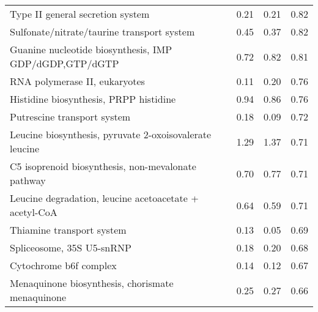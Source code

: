 \begin{sidewaystable}
\begin{center}
\begin{tabularx}{\textwidth}{Xlll}
Type II general secretion system & 0.21 & 0.21 & 0.82\\
Sulfonate/nitrate/taurine transport system & 0.45 & 0.37 & 0.82\\
Guanine nucleotide biosynthesis, IMP \textrightarrow{} GDP/dGDP,GTP/dGTP & 0.72 & 0.82 & 0.81\\
RNA polymerase II, eukaryotes & 0.11 & 0.20 & 0.76\\
Histidine biosynthesis, PRPP \textrightarrow{} histidine & 0.94 & 0.86 & 0.76\\
Putrescine transport system & 0.18 & 0.09 & 0.72\\
Leucine biosynthesis, pyruvate \textrightarrow{} 2-oxoisovalerate \textrightarrow{} leucine & 1.29 & 1.37 & 0.71\\
C5 isoprenoid biosynthesis, non-mevalonate pathway & 0.70 & 0.77 & 0.71\\
Leucine degradation, leucine \textrightarrow{} acetoacetate + acetyl-CoA & 0.64 & 0.59 & 0.71\\
Thiamine transport system & 0.13 & 0.05 & 0.69\\
Spliceosome, 35S U5-snRNP & 0.18 & 0.20 & 0.68\\
Cytochrome b6f complex & 0.14 & 0.12 & 0.67\\
Menaquinone biosynthesis, chorismate \textrightarrow{} menaquinone & 0.25 & 0.27 & 0.66\\
\bottomrule
\end{tabularx}
\end{center}
\end{sidewaystable}
